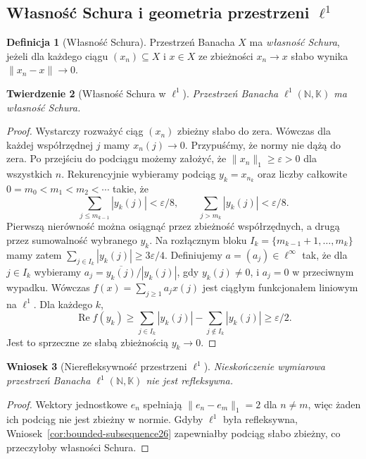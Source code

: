 \documentclass[11pt,a4paper]{article}
\numberwithin{equation}{section}
\theoremstyle{plain}
\newtheorem{twierdzenie}{Twierdzenie}[section]
\newtheorem{wniosek}[twierdzenie]{Wniosek}
\theoremstyle{definition}
\newtheorem{definicja}[twierdzenie]{Definicja}
\theoremstyle{remark}
\newcommand{\N}{\mathbb N}
\newcommand{\K}{\mathbb K}
\begin{document}
\subsection{Własność Schura i geometria przestrzeni \texorpdfstring{$\ell^1$}{ell1}}

\begin{definicja}[Własność Schura]
\label{def:schur26}
Przestrzeń Banacha $X$ ma \emph{własność Schura}, jeżeli dla
każdego ciągu $(x_n)\subseteq X$ i $x\in X$ ze zbieżności
$x_n\to x$ słabo wynika $\|x_n-x\|\to0$.
\end{definicja}

\begin{twierdzenie}[Własność Schura w $\ell^1$]
\label{thm:schur-l1-26}
Przestrzeń Banacha $\ell^1(\N,\K)$ ma własność Schura.
\end{twierdzenie}
\begin{proof}
Wystarczy rozważyć ciąg $(x_n)$ zbieżny słabo do zera.
Wówczas dla każdej współrzędnej $j$ mamy $x_n(j)\to0$.
Przypuśćmy, że normy nie dążą do zera. Po przejściu do
podciągu możemy założyć, że $\|x_n\|_1\ge\varepsilon>0$
dla wszystkich $n$. Rekurencyjnie wybieramy podciąg
$y_k=x_{n_k}$ oraz liczby całkowite
$0=m_0<m_1<m_2<\cdots$ takie, że
\[
\sum_{j\le m_{k-1}}|y_k(j)|<\varepsilon/8,
\qquad
\sum_{j>m_k}|y_k(j)|<\varepsilon/8.
\]
Pierwszą nierówność można osiągnąć przez zbieżność
współrzędnych, a drugą przez sumowalność wybranego $y_k$.
Na rozłącznym bloku $I_k=\{m_{k-1}+1,\ldots,m_k\}$
mamy zatem $\sum_{j\in I_k}|y_k(j)|\ge3\varepsilon/4$.
Definiujemy $a=(a_j)\in\ell^\infty$ tak, że dla $j\in I_k$
wybieramy $a_j=\overline{y_k(j)}/|y_k(j)|$, gdy $y_k(j)\ne0$,
i $a_j=0$ w przeciwnym wypadku. Wówczas
$f(x)=\sum_{j\ge1}a_jx(j)$ jest ciągłym funkcjonałem
liniowym na $\ell^1$. Dla każdego $k$,
\[
\operatorname{Re}f(y_k)\ge
\sum_{j\in I_k}|y_k(j)|-\sum_{j\notin I_k}|y_k(j)|
\ge\varepsilon/2.
\]
Jest to sprzeczne ze słabą zbieżnością $y_k\to0$.
\end{proof}

\begin{wniosek}[Nierefleksywność przestrzeni $\ell^1$]
\label{cor:l1-nonreflexive26}
Nieskończenie wymiarowa przestrzeń Banacha $\ell^1(\N,\K)$
nie jest refleksywna.
\end{wniosek}
\begin{proof}
Wektory jednostkowe $e_n$ spełniają
$\|e_n-e_m\|_1=2$ dla $n\ne m$, więc żaden ich podciąg
nie jest zbieżny w normie. Gdyby $\ell^1$ była refleksywna,
Wniosek~\ref{cor:bounded-subsequence26} zapewniałby podciąg
słabo zbieżny, co przeczyłoby własności Schura.
\end{proof}
\end{document}
